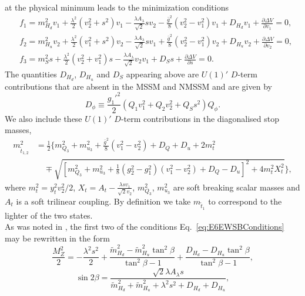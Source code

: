 \documentclass[preprint,amsmath,amssymb,aps,superscriptaddress,prd,showpacs,floatfix,nofootinbib]{revtex4-1}
\begin{document}
at the physical minimum leads to the minimization conditions
\begin{subequations}\label{eq:E6EWSBConditions}
\begin{align}
&f_1=m_{H_d}^2v_1+\frac{\lambda^2}{2}(v_2^2+s^2)v_1-\frac{\lambda A_\lambda}{\sqrt{2}}sv_2-\frac{\bar{g}^2}{8}
(v_2^2-v_1^2)v_1+D_{H_d}v_1+\frac{\partial \Delta V}{\partial v_1}=0,\label{eq:E6EWSBcondition1} \\
&f_2=m_{H_u}^2v_2+\frac{\lambda^2}{2}(v_1^2+s^2)v_2-\frac{\lambda A_\lambda}{\sqrt{2}}sv_1+\frac{\bar{g}^2}{8}
(v_2^2-v_1^2)v_2+D_{H_u}v_2+\frac{\partial \Delta V}{\partial v_2}=0,\label{eq:E6EWSBcondition2} \\
&f_3=m_S^2s+\frac{\lambda^2}{2}(v_2^2+v_1^2)s-\frac{\lambda A_\lambda}{\sqrt{2}}v_2v_1+D_Ss+\frac{\partial \Delta V}{\partial s}=0.\label{eq:E6EWSBcondition3}
\end{align}
\end{subequations}
The quantities $D_{H_d}$, $D_{H_u}$ and $D_S$ appearing above are
$U(1)'$ $D$-term contributions that are absent in the MSSM and NMSSM
and are given by
\begin{equation}\label{eq:E6Dterms}
D_\phi\equiv \frac{g_1'^2}{2}\left (Q_1v_1^2+Q_2v_2^2+Q_Ss^2\right )Q_\phi.
\end{equation}
We also include these $U(1)'$ $D$-term contributions in the diagonalised stop masses,
\begin{align}
  m_{\tilde{t}_{1,2}}^2&=\frac{1}{2}\bigg \{ m_{Q_3}^2+m_{u_3}^2+\frac{\bar{g}^2}{8}\left ( v_1^2-v_2^2\right )+D_Q+D_u+2m_t^2\nonumber\\
&\quad{}\mp\sqrt{\left [ m_{Q_3}^2+m_{u_3}^2+\frac{1}{8}\left ( g_2^2-g_1^2\right )\left ( v_1^2-v_2^2\right ) + D_Q-D_u\right ]^2+4m_t^2X_t^2}\bigg \},
\end{align}
where $m_t^2=y_t^2v_2^2/2$, $X_t=A_t-\frac{\lambda s v_1}{\sqrt{2}v_2}$, $m_{Q_3}^2$, $m_{u_3}^2$ are soft breaking scalar masses and $A_t$ is a soft trilinear coupling. By definition we take $m_{\tilde{t}_1}$ to correspond to the lighter of the two states.\\
As was noted in \cite{Athron:2013ipa}, the first two of the conditions Eq.~\ref{eq:E6EWSBConditions} may be rewritten in the form
\begin{equation}\label{eq:E6MZequation}
\frac{M_Z^2}{2}=-\frac{\lambda^2s^2}{2}+\frac{\tilde{m}_{H_d}^2-\tilde{m}_{H_u}^2\tan^2\beta}{\tan^2\beta-1}+\frac{D_{H_d}-D_{H_u}\tan^2\beta}{\tan^2\beta-1},
\end{equation}
\begin{equation}\label{eq:E6sin2bequation}
\sin 2\beta=\frac{\sqrt{2}\lambda A_{\lambda} s}{\tilde{m}_{H_d}^2+\tilde{m}_{H_u}^2+\lambda^2s^2+D_{H_d}+D_{H_u}},
\end{equation}
\end{document}
